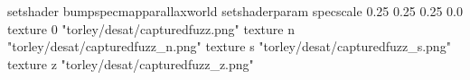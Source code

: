 setshader bumpspecmapparallaxworld
setshaderparam specscale 0.25 0.25 0.25 0.0
texture 0 "torley/desat/capturedfuzz.png"
texture n "torley/desat/capturedfuzz_n.png"
texture s "torley/desat/capturedfuzz_s.png"
texture z "torley/desat/capturedfuzz_z.png"

